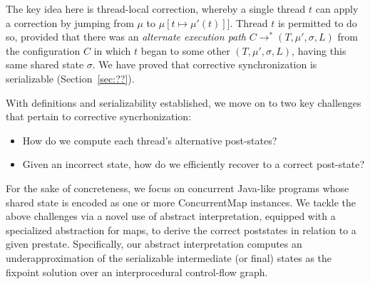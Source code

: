 The key idea here is thread-local correction, whereby a single
thread $t$ can apply a correction by jumping from $\mu$ to
$\mu[t \mapsto \mu'(t)]]$. Thread $t$ is permitted to do so,
  provided that there was an \emph{alternate execution path}
  $C \rightarrow^{*} (T,\mu',\sigma,L)$ from the configuration $C$
  in which $t$ began to some other $(T,\mu',\sigma,L)$, having this
  same shared state $\sigma$.
%
%
%
We have proved that corrective synchronization is serializable (Section~\ref{sec:??}).

%
With definitions and serializability established, we move on to two key challenges
that pertain to corrective syncrhonization:
\begin{itemize}
\item How do we compute each thread's alternative post-states?
\item Given an incorrect state, how do we efficiently recover to a correct post-state?
\end{itemize}
%
For the sake of concreteness, we focus on concurrent Java-like
programs whose shared state is encoded as one or more {\sf
  ConcurrentMap} instances.  We tackle the above challenges via a
novel use of abstract interpretation, equipped with a specialized
abstraction for maps, to derive the correct poststates in relation to
a given prestate.
%
Specifically, our abstract interpretation computes an
underapproximation of the serializable intermediate (or final) states
as the fixpoint solution over an interprocedural control-flow graph.
  
%


